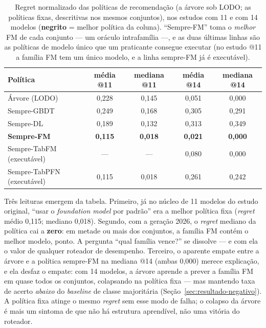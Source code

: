 \begin{table}[htb]
\centering
\caption[Regret das políticas de recomendação]{Regret normalizado
das políticas de recomendação (a árvore sob LODO; as políticas fixas,
descritivas nos mesmos conjuntos), nos
estudos com 11 e com 14 modelos (\textbf{negrito} = melhor política da
coluna). ``Sempre-FM'' toma o \emph{melhor} FM de cada conjunto --- um
oráculo intrafamília ---, e as duas últimas linhas são as políticas de
modelo único que um praticante consegue executar (no estudo @11 a
família FM tem um único modelo, e a linha sempre-FM já é executável).}
\label{tab:regret-lodo}
\small
\begin{tabular}{lcccc}
\toprule
Política & média @11 & mediana @11 & média @14 & mediana @14 \\
\midrule
Árvore (LODO)      & 0,228 & 0,145 & 0,051 & 0,000 \\
Sempre-GBDT        & 0,249 & 0,168 & 0,305 & 0,291 \\
Sempre-DL          & 0,189 & 0,132 & 0,313 & 0,349 \\
\textbf{Sempre-FM} & \textbf{0,115} & \textbf{0,018} & \textbf{0,021} &
\textbf{0,000} \\
\midrule
Sempre-TabFM (executável)  & --- & --- & 0,080 & 0,000 \\
Sempre-TabPFN (executável) & 0,115 & 0,018 & 0,261 & 0,242 \\
\bottomrule
\end{tabular}
\end{table}

Três leituras emergem da tabela. Primeiro, já no núcleo de 11 modelos do estudo original,
``usar o \emph{foundation model} por padrão'' era a melhor política fixa
(\emph{regret} médio 0,115; mediano 0,018). Segundo, com a geração 2026, o
\emph{regret} mediano da política cai a \textbf{zero}: em metade ou mais dos
conjuntos, a família FM contém o melhor modelo, ponto. A pergunta
``qual família vence?'' se dissolve --- e com ela o valor de qualquer
roteador de desempenho. Terceiro, o aparente empate entre a árvore e a
política sempre-FM na mediana @14 (ambas 0,000) merece explicação, e
ela desfaz o empate: com 14 modelos, a árvore aprende a prever a
família FM em quase todos os conjuntos, colapsando na política fixa ---
mas mantendo taxa de acerto \emph{abaixo} do \emph{baseline} de classe majoritária
(Seção~\ref{sec:resultado-negativo}). A política fixa atinge o mesmo
\emph{regret} sem esse modo de falha; o colapso da árvore é mais um sintoma de
que não há estrutura aprendível, não uma vitória do roteador.

